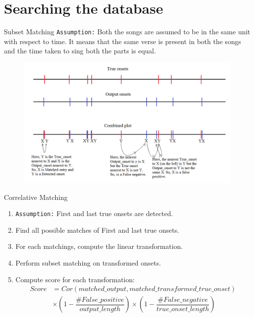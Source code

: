 \documentclass[10pt]{beamer}
\begin{document}
\section{Searching the database}

\begin{frame}{Subset Matching}
\texttt{Assumption:} Both the songs are assumed to be in the same unit with respect to time. It means that the same verse is present in both the songs and the time taken to sing both the parts is equal.

\begin{figure}
    \centering
    \includegraphics[width = \textwidth]{fig/subset_matching.png}
\end{figure}
\end{frame}

\begin{frame}{Correlative Matching}
    \begin{enumerate}
        \item \texttt{Assumption:} First and last true onsets are detected.
        \item Find all possible matches of First and last true onsets.
        \item For each matchings, compute the linear transformation.
        \item Perform subset matching on transformed onsets.
        \item Compute score for each transformation:
        \begin{align*}
            Score & = Cor(matched\_output, matched\_transformed\_true\_onset)\\
            & \times \left(1 - \dfrac{\#False\_positive}{output\_length}\right) \times \left(1 - \dfrac{\#False\_negative}{true\_onset\_length}\right)
        \end{align*}
    \end{enumerate}
\end{frame}
\end{document}
